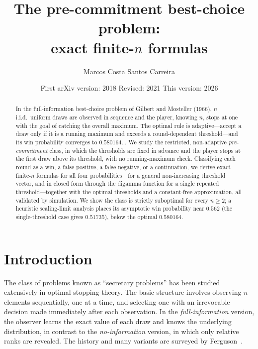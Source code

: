 \documentclass[11pt]{article}
\title{\bfseries The pre-commitment best-choice problem:\\ exact finite-$n$ formulas}
\author{Marcos Costa Santos Carreira}
\affil{A5X \quad \texttt{marcoscscarreira@gmail.com}}
\date{First arXiv version: 2018 \quad Revised: 2021 \quad This version: 2026}
\begin{document}
\maketitle

\begin{abstract}
In the full-information best-choice problem of Gilbert and Mosteller (1966), $n$ i.i.d.\
uniform draws are observed in sequence and the player, knowing $n$, stops at one with the
goal of catching the overall maximum. The optimal rule is adaptive---accept a draw only if
it is a running maximum and exceeds a round-dependent threshold---and its win probability
converges to $0.580164\ldots$ We study the restricted, non-adaptive \emph{pre-commitment}
class, in which the thresholds are fixed in advance and the player stops at the first draw
above its threshold, with no running-maximum check. Classifying each round as a win, a
false positive, a false negative, or a continuation, we derive exact finite-$n$ formulas
for all four probabilities---for a general non-increasing threshold vector, and in closed
form through the digamma function for a single repeated threshold---together with the
optimal thresholds and a constant-free approximation, all validated by simulation. We show
the class is strictly suboptimal for every $n\ge2$; a heuristic scaling-limit analysis
places its asymptotic win probability near $0.562$ (the single-threshold case gives
$0.51735$), below the optimal $0.580164$.
\end{abstract}

\section{Introduction}

The class of problems known as ``secretary problems'' has been studied extensively in
optimal stopping theory. The basic structure involves observing $n$ elements
sequentially, one at a time, and selecting one with an irrevocable decision made
immediately after each observation. In the \emph{full-information} version, the
observer learns the exact value of each draw and knows the underlying distribution,
in contrast to the \emph{no-information} version, in which only relative ranks are
revealed. The history and many variants are surveyed by Ferguson~\cite{Ferguson1989}.
\end{document}

